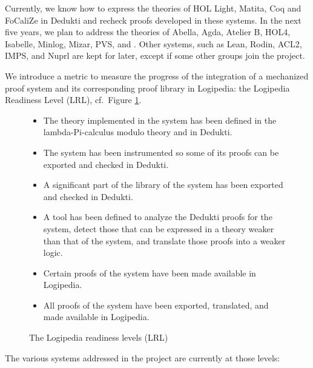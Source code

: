 Currently, we know how to express the theories of {\sc HOL Light},
{\sc Matita}, {\sc Coq} and {\sc FoCaliZe} in {\sc Dedukti} and recheck proofs
developed in these systems. In the next five years, we plan to address
the theories of {\sc Abella}, {\sc Agda}, {\sc Atelier B},
{\sc HOL4}, {\sc Isabelle}, {\sc Minlog}, {\sc Mizar},
{\sc PVS}, and \tlaplus. Other systems, such as {\sc Lean}, {\sc Rodin}, {\sc ACL2},
{\sc IMPS}, and {\sc Nuprl} are kept for later, except if some other
groups join the project.

We introduce a metric to measure the progress of the
integration of a mechanized proof system and its corresponding proof library in
Logipedia: the Logipedia Readiness Level (LRL), cf.\ Figure \ref{lrl}.

\begin{figure}[ht]
\begin{itemize}
\item[LRL level 1:]
The theory implemented in the system has been defined in
the lambda-Pi-calculus modulo theory and in Dedukti.

\item[LRL level 2:]
The system has been instrumented so some of its proofs can be exported
and checked in Dedukti.

\item[LRL level 3:]
A significant part of the library of the system has been exported and checked in
Dedukti.

\item[LRL level 4:]
A tool has been defined to analyze the Dedukti proofs for the system,
detect those that can be expressed in a theory weaker than that of the
system, and translate those proofs into a weaker logic.

\item[LRL level 5:]
Certain proofs of the system have been made available in Logipedia.

\item[LRL level 6:]
All proofs of the system have been exported, translated,
and made available in Logipedia.
\end{itemize}
\caption{The Logipedia readiness levels (LRL)\label{lrl}}
\end{figure}

The various systems addressed in the project are currently at those levels:

